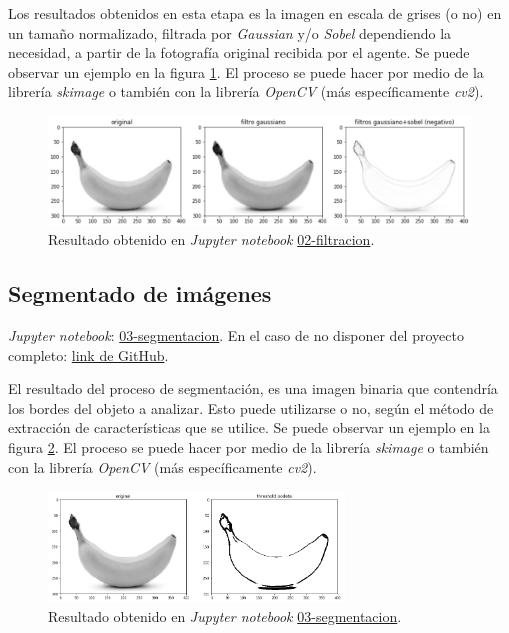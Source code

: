 \documentclass[10pt,a4paper]{article}
\begin{document}
Los resultados obtenidos en esta etapa es la imagen en escala de grises (o no) en un tamaño normalizado, filtrada por \textit{Gaussian} y/o \textit{Sobel} dependiendo la necesidad, a partir de la fotografía original recibida por el agente. Se puede observar un ejemplo en la figura \ref{resultado-02}. El proceso se puede hacer por medio de la librería \textit{skimage} o también con la librería \textit{OpenCV} (más específicamente \textit{cv2}).

\begin{figure}[h]
\centering
\includegraphics[width=\textwidth]{imgs/resultado-02.png}
\caption{Resultado obtenido en \textit{Jupyter notebook} \href{./02-filtracion}{02-filtracion}.}
\label{resultado-02}
\end{figure}

\subsection{Segmentado de imágenes}
\textit{Jupyter notebook}: \href{./03-segmentacion.ipynb}{03-segmentacion}. En el caso de no disponer del proyecto completo: \href{https://github.com/FernandezGFG/fruit-classifier/blob/master/03-segmentacion.ipynb}{link de GitHub}.

El resultado del proceso de segmentación, es una imagen binaria que contendría los bordes del objeto a analizar. Esto puede utilizarse o no, según el método de extracción de características que se utilice. Se puede observar un ejemplo en la figura \ref{resultado-03}. El proceso se puede hacer por medio de la librería \textit{skimage} o también con la librería \textit{OpenCV} (más específicamente \textit{cv2}).

\begin{figure}[h]
\centering
\includegraphics[width=0.7\textwidth]{imgs/resultado-03.png}
\caption{Resultado obtenido en \textit{Jupyter notebook} \href{./03-segmentacion}{03-segmentacion}.}
\label{resultado-03}
\end{figure}
\end{document}
